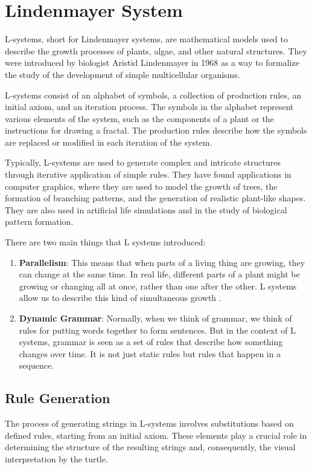 \section{Lindenmayer System}
L-systems, short for Lindenmayer systems, are mathematical models used to describe the growth processes of plants, algae, and other natural structures. They were introduced by biologist Aristid Lindenmayer in 1968 as a way to formalize the study of the development of simple multicellular organisms. 

L-systems consist of an alphabet of symbols, a collection of production rules, an initial axiom, and an iteration process. The symbols in the alphabet represent various elements of the system, such as the components of a plant or the instructions for drawing a fractal. The production rules describe how the symbols are replaced or modified in each iteration of the system.

Typically, L-systems are used to generate complex and intricate structures through iterative application of simple rules. They have found applications in computer graphics, where they are used to model the growth of trees, the formation of branching patterns, and the generation of realistic plant-like shapes. They are also used in artificial life simulations and in the study of biological pattern formation.

There are two main things that L systems introduced:

\begin{enumerate}
    \item \textbf{Parallelism}: This means that when parts of a living thing are growing, they can change at the same time. In real life, different parts of a plant might be growing or changing all at once, rather than one after the other. L systems allow us to describe this kind of simultaneous growth \cite{rozenberg1980mathematical}.
    
    \item \textbf{Dynamic Grammar}: Normally, when we think of grammar, we think of rules for putting words together to form sentences. But in the context of L systems, grammar is seen as a set of rules that describe how something changes over time. It is not just static rules but rules that happen in a sequence.
\end{enumerate}

\vspace*{4mm}
\noindent\subsection{Rule Generation}
The process of generating strings in L-systems involves substitutions based on defined rules, starting from an initial axiom. These elements play a crucial role in determining the structure of the resulting strings and, consequently, the visual interpretation by the turtle.

